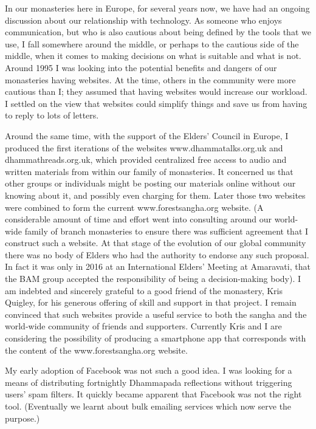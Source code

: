 In our monasteries here in Europe, for several years now, we have had an
ongoing discussion about our relationship with technology. As someone
who enjoys communication, but who is also cautious about being defined
by the tools that we use, I fall somewhere around the middle, or perhaps
to the cautious side of the middle, when it comes to making decisions on
what is suitable and what is not. Around 1995 I was looking into the
potential benefits and dangers of our monasteries having websites. At
the time, others in the community were more cautious than I; they
assumed that having websites would increase our workload. I settled on
the view that websites could simplify things and save us from having to
reply to lots of letters.

Around the same time, with the support of the Elders' Council in Europe,
I produced the first iterations of the websites www.dhammatalks.org.uk
and dhammathreads.org.uk, which provided centralized free access to
audio and written materials from within our family of monasteries. It
concerned us that other groups or individuals might be posting our
materials online without our knowing about it, and possibly even
charging for them. Later those two websites were combined to form the
current www.forestsangha.org\cite{branches} website.
(A considerable amount of time and effort went into
consulting around our world-wide family of branch monasteries to ensure
there was sufficient agreement that I construct such a website. At that
stage of the evolution of our global community there was no body of
Elders who had the authority to endorse any such proposal. In fact it
was only in 2016 at an International Elders' Meeting at Amaravati, that
the BAM group accepted the responsibility of being a decision-making
body). I am indebted and sincerely grateful to a good friend of the
monastery, Kris Quigley, for his generous offering of skill and support
in that project. I remain convinced that such websites provide a useful
service to both the sangha and the world-wide community of friends and
supporters. Currently Kris and I are considering the possibility of
producing a smartphone app that corresponds with the content of the
www.forestsangha.org\cite{branches} website.

My early adoption of Facebook was not such a good idea. I was looking
for a means of distributing fortnightly Dhammapada reflections\cite{reflections}
without triggering users' spam filters. It
quickly became apparent that Facebook was not the right tool.
(Eventually we learnt about bulk emailing services which now serve the
purpose.)

